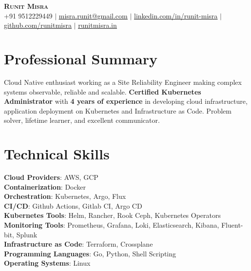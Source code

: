 \documentclass[letterpaper,11pt]{article}
\begin{document}

\begin{center}
    \textbf{\Huge \scshape Runit Misra} \\ \vspace{1pt}
    \small +91 9512229449 $|$ \href{mailto:misra.runit@gmail.com}{\underline{misra.runit@gmail.com}} $|$ 
    \href{https://linkedin.com/in/runit-misra}{\underline{linkedin.com/in/runit-misra}} $|$
    \href{https://github.com/runitmisra}{\underline{github.com/runitmisra}} $|$
    \href{https://www.runitmisra.in}{\underline{runitmisra.in}}
\end{center}

%
\section{Professional Summary}
 \begin{itemize}[leftmargin=0.15in, label={}]
    \small{\item{Cloud Native enthusiast working as a Site Reliability Engineer making complex systems observable, reliable and scalable. \textbf{Certified Kubernetes Administrator} with \textbf{4 years of experience} in developing cloud infrastructure, application deployment on Kubernetes and Infrastructure as Code. Problem solver, lifetime learner, and excellent communicator.}}
 \end{itemize}

%
\section{Technical Skills}
 \begin{itemize}[leftmargin=0.15in, label={}]
    \small{\item{
     \textbf{Cloud Providers}{: AWS, GCP} \\
     \textbf{Containerization}{: Docker} \\
     \textbf{Orchestration}{: Kubernetes, Argo, Flux} \\
     \textbf{CI/CD}{: Github Actions, Gitlab CI, Argo CD} \\
     \textbf{Kubernetes Tools}{: Helm, Rancher, Rook Ceph, Kubernetes Operators} \\
     \textbf{Monitoring Tools}{: Prometheus, Grafana, Loki, Elasticsearch, Kibana, Fluent-bit, Splunk} \\
     \textbf{Infrastructure as Code}{: Terraform, Crossplane} \\
     \textbf{Programming Languages}{: Go, Python, Shell Scripting} \\
     \textbf{Operating Systems}{: Linux}
    }}
 \end{itemize}
\end{document}
